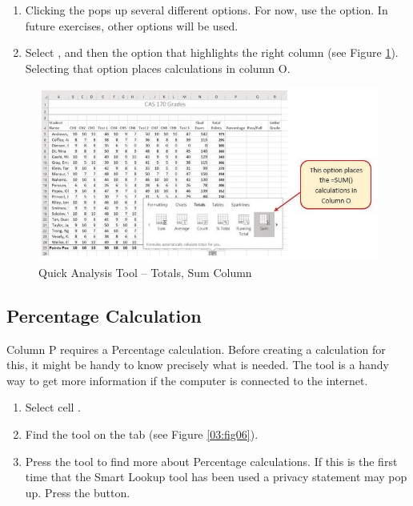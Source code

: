 \begin{enumerate}[resume]
	\item Clicking the  pops up several different options. For now, use the  option. In future exercises, other options will be used.
	\item Select , and then the  option that highlights the right column (see Figure \ref{03:fig05}). Selecting that  option places  calculations in column O.
\end{enumerate}

\begin{figure}[H]
	\centering
	\includegraphics[width=\maxwidth{.95\linewidth}]{gfx/ch03_fig05}
	\caption{Quick Analysis Tool – Totals, Sum Column}
	\label{03:fig05}
\end{figure}

\subsection{Percentage Calculation}

Column P requires a Percentage calculation. Before creating a calculation for this, it might be handy to know precisely what is needed. The  tool is a handy way to get more information if the computer is connected to the internet.

\begin{enumerate}
	\item Select cell .
	\item Find the  tool on the  tab (see Figure \ref{03:fig06}).
	\item Press the  tool to find more about Percentage calculations. If this is the first time that the Smart Lookup tool has been used a privacy statement may pop up. Press the  button.
\end{enumerate}

